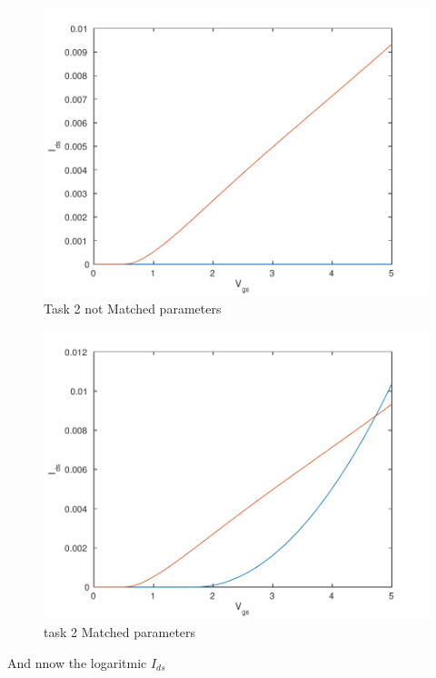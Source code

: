 \documentclass[11pt,a4paper]{report}
\begin{document}
\begin{figure}[ht!]
\caption{Task 2 not Matched parameters}
\centering
\includegraphics[scale=1]{task2-nomatch-eps-converted-to.pdf}
\end{figure}
\begin{figure}[ht!]
\caption{task 2 Matched parameters}
\centering
\includegraphics[scale=1]{task2-match-eps-converted-to.pdf}
\end{figure}
And nnow the logaritmic $I_{ds}$
\end{document}
